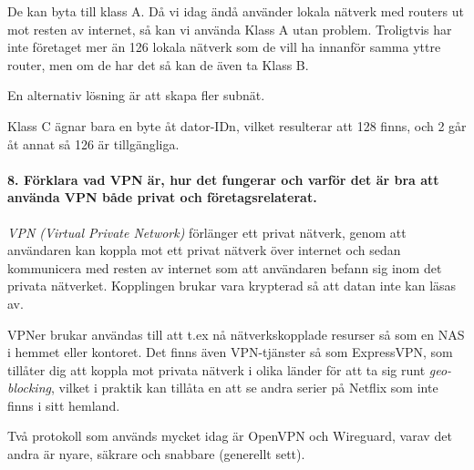 De kan byta till klass A. Då vi idag ändå använder lokala nätverk med routers ut mot resten av internet, så kan vi använda Klass A utan problem. Troligtvis har inte företaget mer än 126 lokala nätverk som de vill ha innanför samma yttre router, men om de har det så kan de även ta Klass B.

En alternativ lösning är att skapa fler subnät.

Klass C ägnar bara en byte åt dator-IDn, vilket resulterar att 128 finns, och 2 går åt annat så 126 är tillgängliga.

\paragraph{8. Förklara vad VPN är, hur det fungerar och varför det är bra att använda VPN både privat och företagsrelaterat.}

\textit{VPN (Virtual Private Network)} förlänger ett privat nätverk, genom att användaren kan koppla mot ett privat nätverk över internet och sedan kommunicera med resten av internet som att användaren befann sig inom det privata nätverket. Kopplingen brukar vara krypterad så att datan inte kan läsas av.

VPNer brukar användas till att t.ex nå nätverkskopplade resurser så som en NAS i hemmet eller kontoret. Det finns även VPN-tjänster så som ExpressVPN, som tillåter dig att koppla mot privata nätverk i olika länder för att ta sig runt \textit{geo-blocking}, vilket i praktik kan tillåta en att se andra serier på Netflix som inte finns i sitt hemland.

Två protokoll som används mycket idag är OpenVPN och Wireguard, varav det andra är nyare, säkrare och snabbare (generellt sett).


















